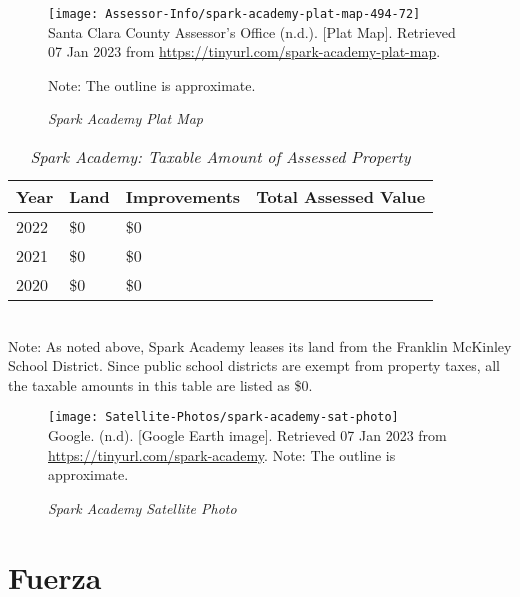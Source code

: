 \begin{figure}[hbt]
    \caption[Spark Academy Plat Map]{\textit{Spark Academy Plat Map}}\label{fig:spark-academy-plat-map}
    \texttt{[image: Assessor-Info/spark-academy-plat-map-494-72]}\\ %
    \footnotesize{Santa Clara County Assessor's Office (n.d.). [Plat Map]. Retrieved 07 Jan 2023 from  \url{https://tinyurl.com/spark-academy-plat-map}}.
    
    \noindent\footnotesize{Note: The outline is approximate.}
  \end{figure}

\begin{table}[hbt]
  \SingleSpacing%
  \caption[Spark Academy: Taxable Amount of Assessed Propery]{\textit{Spark Academy: Taxable Amount of Assessed Property}}\label{tab:spark-academy-taxable-amount}
  \begin{tabular}{llll}
    \toprule
    Year & Land        & Improvements & Total Assessed Value \\
    \midrule
    2022 & \$0         & \$0          & \\
    2021 & \$0         & \$0          & \\
    2020 & \$0         & \$0          & \\
    \bottomrule
  \end{tabular}\\
  \noindent\footnotesize{Note: As noted above, Spark Academy leases its land from the Franklin McKinley School District. Since public school districts are exempt from property taxes, all the taxable amounts in this table are listed as \$0.}
\end{table}

\begin{figure}[hbt]
  \centering
  \caption[Spark Academy Satellite Photo] {\textit{Spark Academy Satellite Photo}}\label{fig:spark-academy-sat-photo}
  \texttt{[image: Satellite-Photos/spark-academy-sat-photo]}\\ %
  \footnotesize{Google. (n.d). [Google Earth image]. Retrieved 07 Jan 2023 from \url{https://tinyurl.com/spark-academy}.}
  \noindent\footnotesize{Note: The outline is approximate.}
\end{figure}


\clearpage
\section{Fuerza }\label{sec:fuerza-info}

